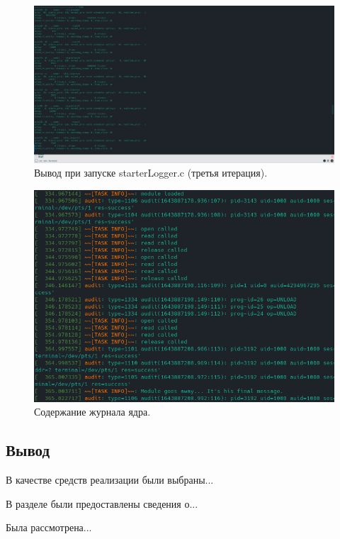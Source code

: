 \begin{figure}[H]
	\centering
	\includegraphics[scale=0.5, angle=-90]{img/thirdIt.png}
	\caption{Вывод при запуске starterLogger.c (третья итерация). }
	\label{fig:thirdIt}
\end{figure}

\begin{figure}[H]
	\centering
	\includegraphics[scale=0.8]{img/dmesg.png}
	\caption{Содержание журнала ядра. }
	\label{fig:dmesg}
\end{figure}

\subsection*{Вывод}
В качестве средств реализации были выбраны...

В разделе были предоставлены сведения о...

Была рассмотрена...